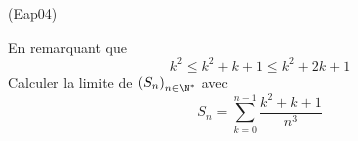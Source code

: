 \begin{tiny}(Eap04)\end{tiny}
En remarquant que 
\begin{displaymath}
 k^2 \leq k^2+k+1 \leq k^2+2k+1
\end{displaymath}
Calculer la limite de $\left(S_n \right)_{n\in\N^*}$ avec 
\begin{displaymath}
 S_n = \sum_{k=0}^{n-1}\frac{k^2+k+1}{n^3}
\end{displaymath}
